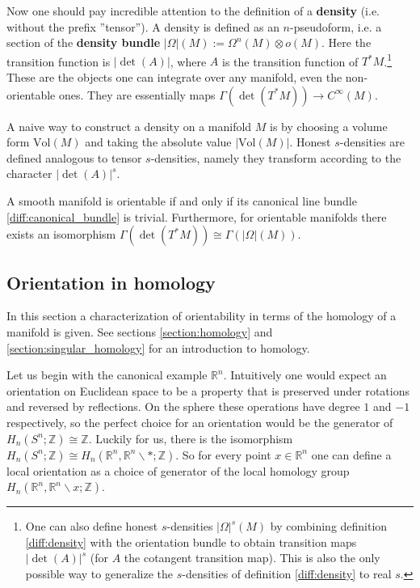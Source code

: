     \begin{remark}\label{diff:honest_density}
        Now one should pay incredible attention to the definition of a \textbf{density} (i.e. without the prefix ''tensor''). A density is defined as an $n$-pseudoform, i.e. a section of the \textbf{density bundle} $|\Omega|(M):=\Omega^n(M)\otimes o(M)$. Here the transition function is $|\det(A)|$, where $A$ is the transition function of $T^*M$.\footnote{One can also define honest $s$-densities $|\Omega|^s(M)$ by combining definition \ref{diff:density} with the orientation bundle to obtain transition maps $|\det(A)|^s$ (for $A$ the cotangent transition map). This is also the only possible way to generalize the $s$-densities of definition \ref{diff:density} to real $s$.}  These are the objects one can integrate over any manifold, even the non-orientable ones. They are essentially maps $\Gamma(\det(T^*M))\rightarrow C^\infty(M)$.

        A naive way to construct a density on a manifold $M$ is by choosing a volume form $\text{Vol}(M)$ and taking the absolute value $|\text{Vol}(M)|$. Honest $s$-densities are defined analogous to tensor $s$-densities, namely they transform according to the character $|\det(A)|^s$.
    \end{remark}
    \begin{property}[Orientability]
        A smooth manifold is orientable if and only if its canonical line bundle \ref{diff:canonical_bundle} is trivial. Furthermore, for orientable manifolds there exists an isomorphism $\Gamma(\det(T^*M))\cong\Gamma(|\Omega|(M))$.
    \end{property}

\subsection{Orientation in homology}

    In this section a characterization of orientability in terms of the homology of a manifold is given. See sections \ref{section:homology} and \ref{section:singular_homology} for an introduction to homology.

    Let us begin with the canonical example $\mathbb{R}^n$. Intuitively one would expect an orientation on Euclidean space to be a property that is preserved under rotations and reversed by reflections. On the sphere these operations have degree $1$ and $-1$ respectively, so the perfect choice for an orientation would be the generator of $H_n(S^n;\mathbb{Z})\cong\mathbb{Z}$. Luckily for us, there is the isomorphism $H_n(S^n;\mathbb{Z})\cong H_n(\mathbb{R}^n, \mathbb{R}^n\backslash\ast;\mathbb{Z})$. So for every point $x\in\mathbb{R}^n$ one can define a local orientation as a choice of generator of the local homology group $H_n(\mathbb{R}^n, \mathbb{R}^n\backslash x;\mathbb{Z})$.

